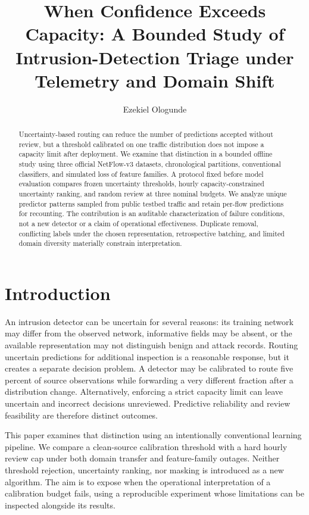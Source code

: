 \documentclass[manuscript,screen,nonacm]{acmart}
\title{When Confidence Exceeds Capacity: A Bounded Study of Intrusion-Detection Triage under Telemetry and Domain Shift}
\author{Ezekiel Ologunde}
\affiliation[obeypunctuation=true]{\institution{Independent Researcher}\country{}}
\begin{document}
\begin{abstract}
Uncertainty-based routing can reduce the number of predictions accepted without review, but a threshold calibrated on one traffic distribution does not impose a capacity limit after deployment. We examine that distinction in a bounded offline study using three official NetFlow-v3 datasets, chronological partitions, conventional classifiers, and simulated loss of feature families. A protocol fixed before model evaluation compares frozen uncertainty thresholds, hourly capacity-constrained uncertainty ranking, and random review at three nominal budgets. We analyze unique predictor patterns sampled from public testbed traffic and retain per-flow predictions for recounting. %
The contribution is an auditable characterization of failure conditions, not a new detector or a claim of operational effectiveness. Duplicate removal, conflicting labels under the chosen representation, retrospective batching, and limited domain diversity materially constrain interpretation.
\end{abstract}
\maketitle

\section{Introduction}
An intrusion detector can be uncertain for several reasons: its training network may differ from the observed network, informative fields may be absent, or the available representation may not distinguish benign and attack records. Routing uncertain predictions for additional inspection is a reasonable response, but it creates a separate decision problem. A detector may be calibrated to route five percent of source observations while forwarding a very different fraction after a distribution change. Alternatively, enforcing a strict capacity limit can leave uncertain and incorrect decisions unreviewed. Predictive reliability and review feasibility are therefore distinct outcomes.

This paper examines that distinction using an intentionally conventional learning pipeline. We compare a clean-source calibration threshold with a hard hourly review cap under both domain transfer and feature-family outages. Neither threshold rejection, uncertainty ranking, nor masking is introduced as a new algorithm. The aim is to expose when the operational interpretation of a calibration budget fails, using a reproducible experiment whose limitations can be inspected alongside its results.
\end{document}
